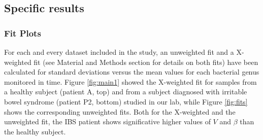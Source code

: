 %
%

\subsection*{Specific results}

\subsubsection*{Fit Plots}
For each and every dataset included in the study, an unweighted fit and a X-weighted fit (see Material and Methods section for details on both fits) have been calculated for standard deviations versus the mean values for each bacterial genus monitored in time. Figure \ref{fig:main1} showed the X-weighted fit for samples from a healthy subject (patient A, top) and from a subject diagnosed with irritable bowel syndrome (patient P2, bottom) studied in our lab\cite{IBS}, while Figure \ref{fig:fits} shows the corresponding unweighted fits. Both for the X-weighted and the unweighted fit, the IBS patient shows significative higher values of $V$ and $\beta$ than the healthy subject.

